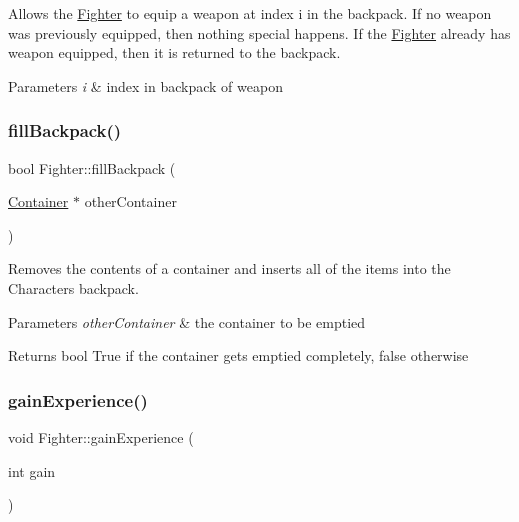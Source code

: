 Allows the \hyperlink{class_fighter}{Fighter} to equip a weapon at index \textquotesingle{}i\textquotesingle{} in the backpack. If no weapon was previously equipped, then nothing special happens. If the \hyperlink{class_fighter}{Fighter} already has weapon equipped, then it is returned to the backpack. 
\begin{DoxyParams}{Parameters}
{\em i} & index in backpack of weapon \\
\hline
\end{DoxyParams}
\hypertarget{class_fighter_a572fb61d329f4993701900ff3a1db5f8}{}\label{class_fighter_a572fb61d329f4993701900ff3a1db5f8} 
\subsubsection{\texorpdfstring{fill\+Backpack()}{fillBackpack()}}
{\footnotesize\ttfamily bool Fighter\+::fill\+Backpack (\begin{DoxyParamCaption}\item[{\hyperlink{class_container}{Container} $\ast$}]{other\+Container }\end{DoxyParamCaption})}

Removes the contents of a container and inserts all of the items into the Character\textquotesingle{}s backpack. 
\begin{DoxyParams}{Parameters}
{\em other\+Container} & the container to be emptied \\
\hline
\end{DoxyParams}
\begin{DoxyReturn}{Returns}
bool True if the container gets emptied completely, false otherwise 
\end{DoxyReturn}
\hypertarget{class_fighter_af411947929c37ef0a0eab87b0c45f4f3}{}\label{class_fighter_af411947929c37ef0a0eab87b0c45f4f3} 
\subsubsection{\texorpdfstring{gain\+Experience()}{gainExperience()}}
{\footnotesize\ttfamily void Fighter\+::gain\+Experience (\begin{DoxyParamCaption}\item[{int}]{gain }\end{DoxyParamCaption})}

